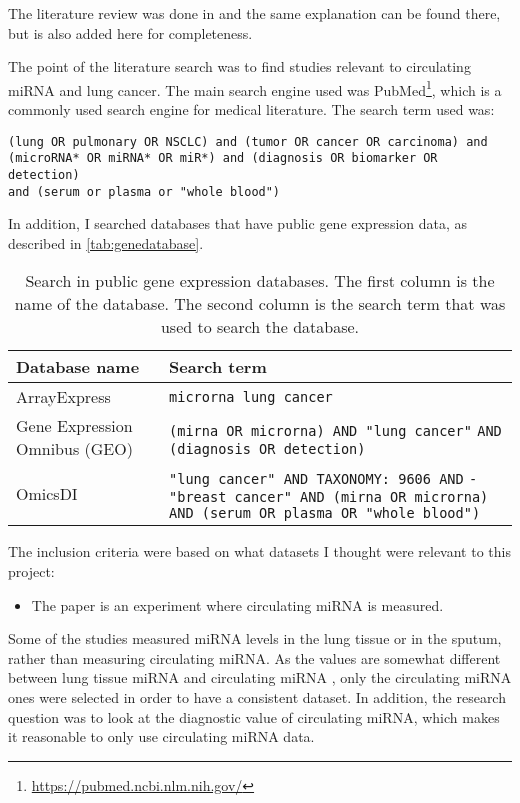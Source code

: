 The literature review was done in \citet{forprosjekt} and the same explanation can be found there, but is also added here for completeness.

The point of the literature search was to find studies relevant to circulating miRNA and lung cancer. The main search engine used was PubMed\footnote{\url{https://pubmed.ncbi.nlm.nih.gov/}}, which is a commonly used search engine for medical literature. The search term used was:
\begin{verbatim}
(lung OR pulmonary OR NSCLC) and (tumor OR cancer OR carcinoma) and
(microRNA* OR miRNA* OR miR*) and (diagnosis OR biomarker OR detection)
and (serum or plasma or "whole blood")
\end{verbatim}
In addition, I searched databases that have public gene expression data, as described in \autoref{tab:genedatabase}.
\begin{table}[htbp]
\begin{center}
\caption{Search in public gene expression databases. The first column is the name of the database. The second column is the search term that was used to search the database.}
\label{tab:genedatabase}
\begin{tabular}{|p{}|p{}|}\hline
\bfseries Database name & \bfseries Search term\\\hline
ArrayExpress\tablefootnote{\url{https://www.ebi.ac.uk/arrayexpress/}} & \verb|microrna lung cancer|\\\hline
Gene Expression Omnibus (GEO)\tablefootnote{\url{https://www.ncbi.nlm.nih.gov/gds}} & \verb|(mirna OR microrna) AND "lung cancer"| \verb|AND (diagnosis OR detection) |\\\hline
OmicsDI\tablefootnote{\url{https://www.omicsdi.org}} & \verb|"lung cancer" AND TAXONOMY: 9606 AND| \verb|-"breast cancer" AND (mirna OR microrna)| \verb|AND (serum OR plasma OR "whole blood")|\\\hline
\end{tabular}
\end{center}
\end{table}

The inclusion criteria were based on what datasets I thought were relevant to this project:
\begin{itemize}
    \item The paper is an experiment where circulating miRNA is measured.
\end{itemize}
Some of the studies measured miRNA levels in the lung tissue or in the sputum, rather than measuring circulating miRNA. As the values are somewhat different between lung tissue miRNA and circulating miRNA \citep{differentserumtissue}, only the circulating miRNA ones were selected in order to have a consistent dataset. In addition, the research question was to look at the diagnostic value of circulating miRNA, which makes it reasonable to only use circulating miRNA data.

